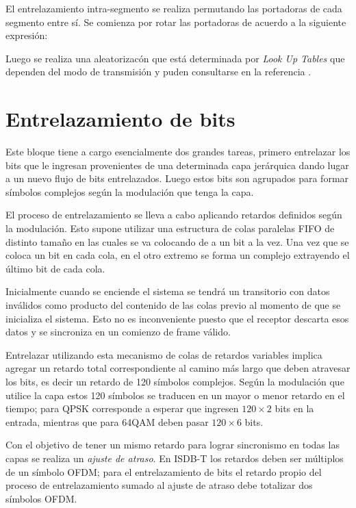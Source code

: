 El entrelazamiento intra-segmento se realiza permutando las portadoras de cada segmento entre s\'i. Se comienza por rotar las portadoras de acuerdo a la siguiente expresi\'on:

Luego se realiza una aleatorizac\'on que est\'a determinada por \textit{Look Up Tables} que dependen del modo de transmisi\'on y puden consultarse en la referencia \cite{bb}.


\section{Entrelazamiento de bits}

Este bloque tiene a cargo esencialmente dos grandes tareas, primero entrelazar los bits que le ingresan provenientes de una determinada capa jerárquica dando lugar a un nuevo flujo de bits entrelazados. Luego estos bits son agrupados para formar símbolos complejos según la modulación que tenga la capa.

El proceso de entrelazamiento se lleva a cabo aplicando retardos definidos según la modulación. Esto supone utilizar una estructura de colas paralelas FIFO de distinto tamaño en las cuales se va colocando de a un bit a la vez. Una vez que se coloca un bit en cada cola, en el otro extremo se forma un complejo extrayendo el último bit de cada cola.

Inicialmente cuando se enciende el sistema se tendrá un transitorio con datos inválidos como producto del contenido de las colas previo al momento de que se inicializa el sistema. Esto no es inconveniente puesto que el receptor descarta esos datos y se sincroniza en un comienzo de frame válido.

Entrelazar utilizando esta mecanismo de colas de retardos variables implica agregar un retardo total correspondiente al camino más largo que deben atravesar los bits, es decir un retardo de 120 símbolos complejos. Según la modulación que utilice la capa estos 120 símbolos se traducen en un mayor o menor retardo en el tiempo; para QPSK corresponde a esperar que ingresen $120 \times 2$ bits en la entrada, mientras que para 64QAM deben pasar $120 \times 6$ bits.

Con el objetivo de tener un mismo retardo para lograr sincronismo en todas las capas se realiza un \textit{ajuste de atraso}. En ISDB-T los retardos deben ser m\'ultiplos de un s\'imbolo OFDM; para el entrelazamiento de bits el retardo propio del proceso de entrelazamiento sumado al ajuste de atraso debe totalizar dos s\'imbolos OFDM.

